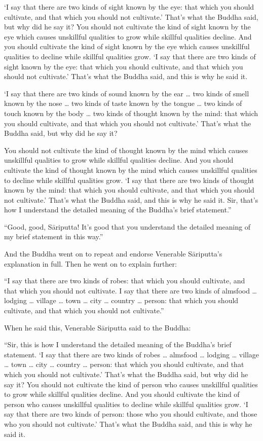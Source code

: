\documentclass[12pt,openany]{book}%
\begin{document}
‘I say that there are two kinds of sight known by the eye: that which you should cultivate, and that which you should not cultivate.’ That’s what the Buddha said, but why did he say it? You should not cultivate the kind of sight known by the eye which causes unskillful qualities to grow while skillful qualities decline. And you should cultivate the kind of sight known by the eye which causes unskillful qualities to decline while skillful qualities grow. ‘I say that there are two kinds of sight known by the eye: that which you should cultivate, and that which you should not cultivate.’ That’s what the Buddha said, and this is why he said it. 

‘I say that there are two kinds of sound known by the ear … two kinds of smell known by the nose … two kinds of taste known by the tongue … two kinds of touch known by the body … two kinds of thought known by the mind: that which you should cultivate, and that which you should not cultivate.’ That’s what the Buddha said, but why did he say it? 

You should not cultivate the kind of thought known by the mind which causes unskillful qualities to grow while skillful qualities decline. And you should cultivate the kind of thought known by the mind which causes unskillful qualities to decline while skillful qualities grow. ‘I say that there are two kinds of thought known by the mind: that which you should cultivate, and that which you should not cultivate.’ That’s what the Buddha said, and this is why he said it. Sir, that’s how I understand the detailed meaning of the Buddha’s brief statement.” 

“Good, good, \textsanskrit{Sāriputta}! It’s good that you understand the detailed meaning of my brief statement in this way.” 

And the Buddha went on to repeat and endorse Venerable \textsanskrit{Sāriputta}’s explanation in full. Then he went on to explain further: 

“I say that there are two kinds of robes: that which you should cultivate, and that which you should not cultivate. I say that there are two kinds of almsfood … lodging … village … town … city … country … person: that which you should cultivate, and that which you should not cultivate.” 

When he said this, Venerable \textsanskrit{Sāriputta} said to the Buddha: 

“Sir, this is how I understand the detailed meaning of the Buddha’s brief statement. ‘I say that there are two kinds of robes … almsfood … lodging … village … town … city … country … person: that which you should cultivate, and that which you should not cultivate.’ That’s what the Buddha said, but why did he say it? You should not cultivate the kind of person who causes unskillful qualities to grow while skillful qualities decline. And you should cultivate the kind of person who causes unskillful qualities to decline while skillful qualities grow. ‘I say that there are two kinds of person: those who you should cultivate, and those who you should not cultivate.’ That’s what the Buddha said, and this is why he said it. 
\end{document}
